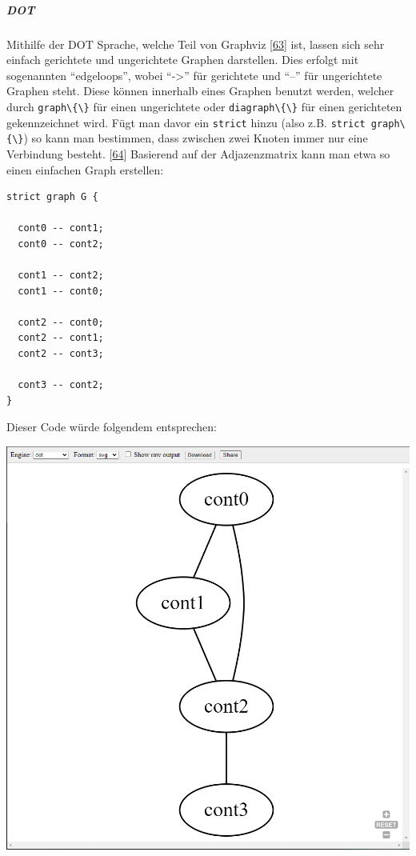 \documentclass[
    headings=optiontotocandhead,%
    twoside,
    numbers=noenddot,%
    12pt, %
    titlepage, %
    parskip=full, %
    listof=leveldown, 
    numbers=noenddot, %
    a4paper,DIV=14,
    BCOR=15mm,
]{scrbook}
\newcommand{\passthrough}[1]{#1}
\let\origfigure=\figure
\let\endorigfigure=\endfigure
\renewenvironment{figure}[1][]{%
   \origfigure[H]
}{%
   \endorigfigure
}
\begin{document}
\hypertarget{dot}{%
\subparagraph{DOT}\label{dot}}

Mithilfe der DOT Sprache, welche Teil von Graphviz
{[}\protect\hyperlink{ref-Graphviz-Homepage}{63}{]} ist, lassen sich
sehr einfach gerichtete und ungerichtete Graphen darstellen. Dies
erfolgt mit sogenannten ``edgeloops'', wobei ``-\textgreater{}'' für
gerichtete und ``--'' für ungerichtete Graphen steht. Diese können
innerhalb eines Graphen benutzt werden, welcher durch
\passthrough{\lstinline!graph\{\}!} für einen ungerichtete oder
\passthrough{\lstinline!diagraph\{\}!} für einen gerichteten
gekennzeichnet wird. Fügt man davor ein \passthrough{\lstinline!strict!}
hinzu (also z.B. \passthrough{\lstinline!strict graph\{\}!}) so kann man
bestimmen, dass zwischen zwei Knoten immer nur eine Verbindung besteht.
{[}\protect\hyperlink{ref-GraphViz-Documentation}{64}{]} Basierend auf
der Adjazenzmatrix kann man etwa so einen einfachen Graph erstellen:

\begin{lstlisting}[caption={Beispiel DOT Code}]
strict graph G {
    
  cont0 -- cont1;
  cont0 -- cont2;
  
  cont1 -- cont2;
  cont1 -- cont0;
  
  cont2 -- cont0;
  cont2 -- cont1;
  cont2 -- cont3;
  
  cont3 -- cont2;
}
\end{lstlisting}

Dieser Code würde folgendem entsprechen:

\begin{figure}
\centering
\includegraphics{img/Gekle/DotGraph.png}
\caption{Ungerichteter Graph mit DOT}
\end{figure}
\end{document}
